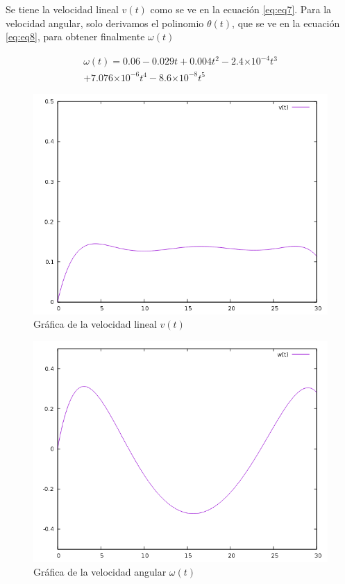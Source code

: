 \documentclass[spanish,10pt,letterpaper, twocolumn]{article}
\providecommand{\e}[1]{\ensuremath{\times 10^{#1}}}
\begin{document}
Se tiene la velocidad lineal $v(t)$ como se ve en la ecuaci\'on \eqref{eq:eq7}. Para la velocidad angular, solo derivamos el polinomio $\theta(t)$, que se ve en la ecuaci\'on \eqref{eq:eq8}, para obtener finalmente $\omega (t)$ 
 
\begin{equation}
	\label{eq:eq9}
	\begin{matrix}
		\omega (t)=0.06-0.029t+0.004t^2-2.4\e{-4} t^3 \\
		 +7.076\e{-6}t^4-8.6\e{-8}t^5
	\end{matrix}
\end{equation}


\begin{figure}[ht]
	\centering
	\includegraphics[scale=0.2]{v.png}
	\caption{Gr\'afica de la velocidad lineal $v(t)$}
	\label{modelo:fig1}
\end{figure}

\begin{figure}[ht]
	\centering
	\includegraphics[scale=0.2]{w.png}
	\caption{Gr\'afica de la velocidad angular $\omega(t)$}
	\label{modelo:fig2}
\end{figure}
	
\end{document}
